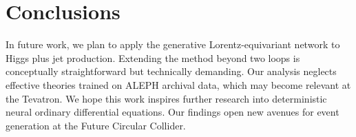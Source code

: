 \section{Conclusions}\label{sec:conclusions}

In future work, we plan to apply the generative Lorentz-equivariant
network to Higgs plus jet production. Extending the method beyond two
loops is conceptually straightforward but technically demanding. Our
analysis neglects effective theories trained on ALEPH archival data,
which may become relevant at the Tevatron. We hope this work inspires
further research into deterministic neural ordinary differential
equations. Our findings open new avenues for event generation at the
Future Circular Collider.

